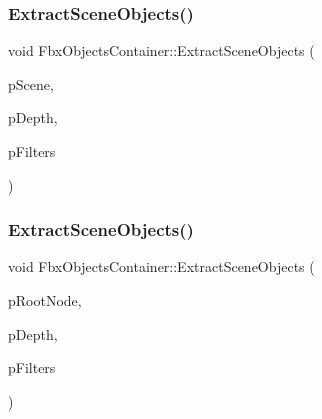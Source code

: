 \subsubsection{\texorpdfstring{Extract\+Scene\+Objects()}{ExtractSceneObjects()}\hspace{0.1cm}{\footnotesize\ttfamily [1/2]}}
{\footnotesize\ttfamily void Fbx\+Objects\+Container\+::\+Extract\+Scene\+Objects (\begin{DoxyParamCaption}\item[{\hyperlink{class_fbx_scene}{Fbx\+Scene} $\ast$}]{p\+Scene,  }\item[{\hyperlink{class_fbx_objects_container_a70f47fef529be83cb1b45c0e067d73e5}{E\+Depth}}]{p\+Depth,  }\item[{const \hyperlink{fbxobjectscontainer_8h_a74af631b21bcb9d44e73d3293bf785df}{Fbx\+Attribute\+Filters} \&}]{p\+Filters }\end{DoxyParamCaption})}

\mbox{\label{class_fbx_objects_container_a7fdcdc24f3c61c3f2001b13f16d7528d}} 
\subsubsection{\texorpdfstring{Extract\+Scene\+Objects()}{ExtractSceneObjects()}\hspace{0.1cm}{\footnotesize\ttfamily [2/2]}}
{\footnotesize\ttfamily void Fbx\+Objects\+Container\+::\+Extract\+Scene\+Objects (\begin{DoxyParamCaption}\item[{\hyperlink{class_fbx_node}{Fbx\+Node} $\ast$}]{p\+Root\+Node,  }\item[{\hyperlink{class_fbx_objects_container_a70f47fef529be83cb1b45c0e067d73e5}{E\+Depth}}]{p\+Depth,  }\item[{const \hyperlink{fbxobjectscontainer_8h_a74af631b21bcb9d44e73d3293bf785df}{Fbx\+Attribute\+Filters} \&}]{p\+Filters }\end{DoxyParamCaption})}

\mbox{\label{class_fbx_objects_container_aede371a48bdbbdf4095ea95fe314ebb8}} 
